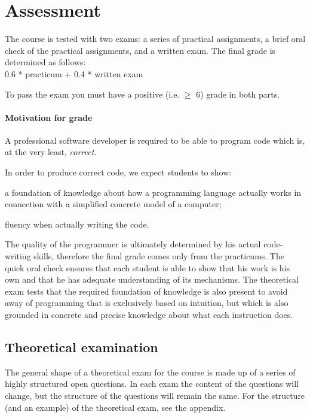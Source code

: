\section{Assessment}
	The course is tested with two exams: a series of practical assignments, a brief oral check of the practical assignments, and a written exam. The final grade is determined as follows: \\

	0.6 * practicum + 0.4 * written exam

	To pass the exam you must have a positive (i.e. $\geq$ 6) grade in both parts.

	\paragraph*{Motivation for grade}
		A professional software developer is required to be able to program code which is, at the very least, \textit{correct}.

		In order to produce correct code, we expect students to show:
		\begin{inparaenum}
			\item a foundation of knowledge about how a programming language actually works in connection with a simplified concrete model of a computer;
			\item fluency when actually writing the code.
		\end{inparaenum}

		The quality of the programmer is ultimately determined by his actual code-writing skills, therefore the final grade comes only from the practicums. The quick oral check ensures that each student is able to show that his work is his own and that he has adequate understanding of its mechanisms. The theoretical exam tests that the required foundation of knowledge is also present to avoid away of programming that is exclusively based on intuition, but which is also grounded in concrete and precise knowledge about what each instruction does.


	\subsection{Theoretical examination}
		The general shape of a theoretical exam for the course is made up of a series of highly structured open questions. In each exam the content of the questions will change, but the structure of the questions will remain the same. For the structure (and an example) of the theoretical exam, see the appendix.


